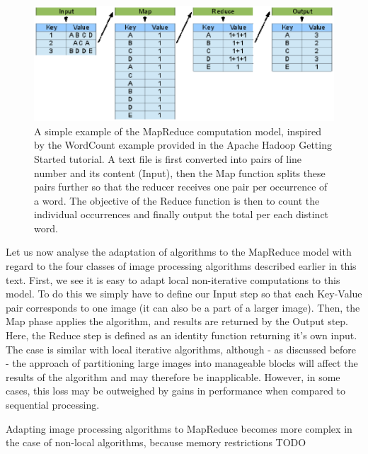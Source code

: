 \documentclass [12pt,a4paper]{report}
\begin{document}
\begin{figure}[h]
\begin{center}
\includegraphics[scale=0.5]{mapreduce.eps} %
\caption{A simple example of the MapReduce computation model, inspired by the WordCount example provided in the Apache Hadoop Getting Started tutorial. A text file is first converted into pairs of line number and its content (Input), then the Map function splits these pairs further so that the reducer receives one pair per occurrence of a word. The objective of the Reduce function is then to count the individual occurrences and finally output the total per each distinct word.}
\label{fig_mapreduce}
\end{center}
\end{figure}

Let us now analyse the adaptation of algorithms to the MapReduce model with regard to the four classes of image processing algorithms described earlier in this text. First, we see it is easy to adapt local non-iterative computations to this model. To do this we simply have to define our Input step so that each Key-Value pair corresponds to one image (it can also be a part of a larger image). Then, the Map phase applies the algorithm, and results are returned by the Output step. Here, the Reduce step is defined as an identity function returning it's own input. The case is similar with local iterative algorithms, although - as discussed before - the approach of partitioning large images into manageable blocks will affect the results of the algorithm and may therefore be inapplicable. However, in some cases, this loss may be outweighed by gains in performance when compared to sequential processing.

Adapting image processing algorithms to MapReduce becomes more complex in the case of non-local algorithms, because memory restrictions TODO

 
\end{document}
